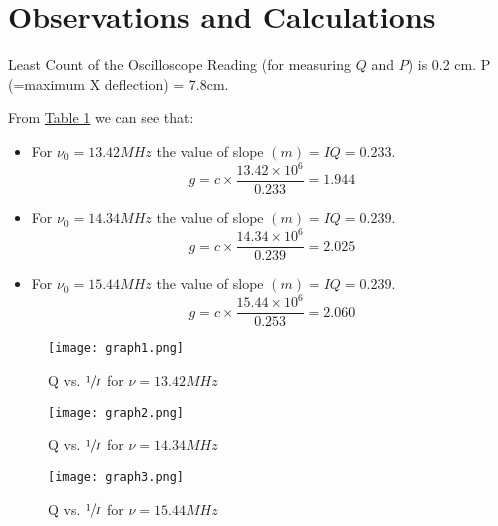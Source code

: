 \section{Observations and Calculations}

	Least Count of the Oscilloscope Reading (for measuring $Q$ and $P$) is 0.2 cm. P (=maximum X deflection) = 7.8cm.

	

	\noindent From \hyperref[tab:data]{Table 1} we can see that:
	
	\begin{itemize}
		\item For $\nu_0 = 13.42MHz$ the value of slope $(m) = IQ = 0.233$.
		$$g = c\times\frac{13.42\times10^6}{0.233} = 1.944$$
		
		\item For $\nu_0 = 14.34MHz$ the value of slope $(m) = IQ = 0.239$.
		$$g = c\times\frac{14.34\times10^6}{0.239} = 2.025$$
		
		\item For $\nu_0 = 15.44MHz$ the value of slope $(m) = IQ = 0.239$.
		$$g = c\times\frac{15.44\times10^6}{0.253} = 2.060$$
	\end{itemize}

	\begin{center}\end{center}	

	\begin{figure}[H]
		\centering
		\texttt{[image: graph1.png]}
		\caption{Q vs. $\sfrac{1}{I}$ for $\nu = 13.42MHz$}
		\label{graph:1}
	\end{figure}

	\begin{figure}[H]
		\centering
		\texttt{[image: graph2.png]}
		\caption{Q vs. $\sfrac{1}{I}$ for $\nu = 14.34MHz$}
		\label{graph:2}
	\end{figure}

	\begin{figure}[H]
		\centering
		\texttt{[image: graph3.png]}
		\caption{Q vs. $\sfrac{1}{I}$ for $\nu = 15.44MHz$}
		\label{graph:3}
	\end{figure}

	
